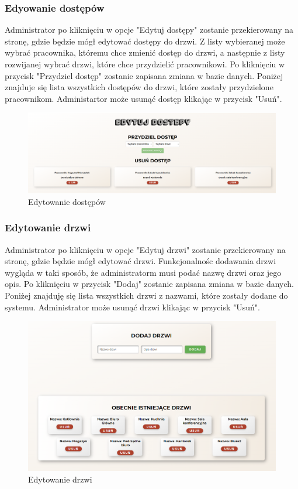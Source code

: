 \newpage

\subsubsection{Edyowanie dostępów}
\noindent Administrator po kliknięciu w opcje "Edytuj dostępy" zostanie przekierowany na stronę, gdzie będzie mógł edytować dostępy do drzwi.
Z listy wybieranej może wybrać pracownika, któremu chce zmienić dostęp do drzwi, a następnie z listy rozwijanej wybrać drzwi, które chce przydzielić pracownikowi.
Po kliknięciu w przycisk "Przydziel dostęp" zostanie zapisana zmiana w bazie danych. Poniżej 
znajduje się lista wszystkich dostępów do drzwi, które zostały przydzielone pracownikom. Administartor
może usunąć dostęp klikając w przycisk "Usuń".
\begin{figure}[h]
    \centering
    \includegraphics[scale=0.3]{photos/edytowanie_dostępów.png}
    \caption{Edytowanie dostępów}
    \label{fig:login}
\end{figure}


\subsubsection{Edytowanie drzwi}
\noindent Administrator po kliknięciu w opcje "Edytuj drzwi" zostanie przekierowany na stronę, 
gdzie będzie mógł edytować drzwi. Funkcjonalnośc dodawania drzwi wygląda w taki sposób, że administratorm
musi podać nazwę drzwi oraz jego opis. Po kliknięciu w przycisk "Dodaj" zostanie zapisana zmiana w bazie danych.
Poniżej znajduję się lista wszystkich drzwi z nazwami, które zostały dodane do systemu. Administrator może usunąć drzwi klikając w przycisk "Usuń".

\begin{figure}[h]
    \centering
    \includegraphics[scale=0.45]{photos/edytowanie_drzwi.png}
    \caption{Edytowanie drzwi}
    \label{fig:login}
\end{figure}

